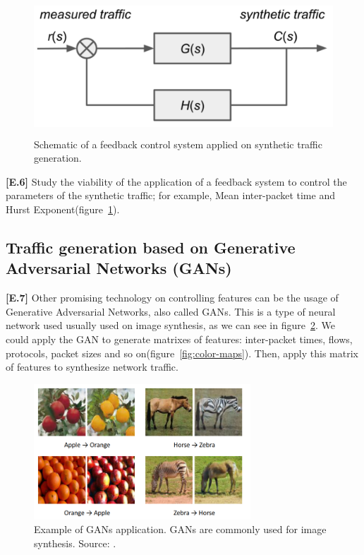 \begin{figure}[!ht]
    \centering
    \includegraphics[height=2.0in]{figures/ch6/control-system}
    \caption{Schematic of a feedback control system applied on synthetic traffic generation.}
    \label{fig:control-system}
\end{figure}

\textbf{[E.6]} Study the viability of the application of a feedback system to control the parameters of the synthetic traffic; for example, Mean inter-packet time and Hurst Exponent(figure~\ref{fig:control-system}).

\subsection{Traffic generation based on Generative Adversarial Networks (GANs)}

\textbf{[E.7]} Other promising technology on controlling features can be the usage of Generative Adversarial Networks, also called \acrfull{GAN}s\cite{gans-paper}. This is a type of neural network used usually used on image synthesis, as we can see in figure~\ref{fig:gans-example}. We could apply the GAN to generate matrixes of features: inter-packet times, flows, protocols, packet sizes and so on(figure~\ref{fig:color-maps}). Then, apply this matrix of features to synthesize network traffic. 

\begin{figure}[!ht]
    \centering
    \includegraphics[height=2.0in]{figures/ch6/gans-example}
    \caption{Example of GANs application. GANs are commonly used for image synthesis. Source: \cite{gans-survey}. }
    \label{fig:gans-example}
\end{figure}

